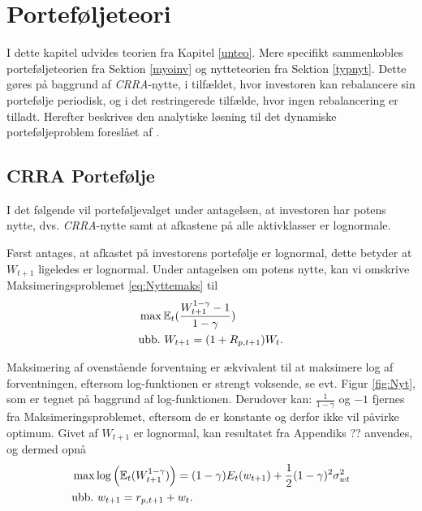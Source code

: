 \documentclass[
  a4paper,
  oneside]{memoir}
\begin{document}
\hypertarget{portefuxf8ljeteori}{%
\chapter{Porteføljeteori}\label{portefuxf8ljeteori}}

I dette kapitel udvides teorien fra Kapitel \ref{unteo}. Mere specifikt sammenkobles porteføljeteorien fra Sektion \ref{myoinv} og nytteteorien fra Sektion \ref{typnyt}. Dette gøres på baggrund af \emph{CRRA}-nytte, i tilfældet, hvor investoren kan rebalancere sin portefølje periodisk, og i det restringerede tilfælde, hvor ingen rebalancering er tilladt. Herefter beskrives den analytiske løsning til det dynamiske porteføljeproblem foreslået af \citep{JurVic2011}.

\hypertarget{crraportef}{%
\section{CRRA Portefølje}\label{crraportef}}

I det følgende vil porteføljevalget under antagelsen, at investoren har potens nytte, dvs. \emph{CRRA}-nytte samt at afkastene på alle aktivklasser er lognormale.

Først antages, at afkastet på investorens portefølje er lognormal, dette betyder at \(W_{t+1}\) ligeledes er lognormal. Under antagelsen om potens nytte, kan vi omskrive Maksimeringsproblemet \eqref{eq:Nyttemaks} til
\begin{align}
&\max\mathbb{E}_t(\frac{W_{t+1}^{1-\gamma}-1}{1-\gamma}) \label{eq:CRRAmaks}\\
&\text{ubb.}\,\,W_{t+1}=(1+R_{p,t+1})W_t.\notag
\end{align}

Maksimering af ovenstående forventning er ækvivalent til at maksimere log af forventningen, eftersom log-funktionen er strengt voksende, se evt. Figur \ref{fig:Nyt}, som er tegnet på baggrund af log-funktionen. Derudover kan: \(\tfrac{1}{1-\gamma}\) og \(-1\) fjernes fra Maksimeringsproblemet, eftersom de er konstante og derfor ikke vil påvirke optimum. Givet af \(W_{t+1}\) er lognormal, kan resultatet fra Appendiks ?? anvendes, og dermed opnå
\begin{align}
&\max \log\left(\mathbb{E}_t(W_{t+1}^{1-\gamma})\right)=(1-\gamma){E}_t(w_{t+1})+\frac{1}{2}(1-\gamma)^2\sigma_{wt}^2 \label{eq:CRRAmakslog}\\
&\text{ubb.}\,\,w_{t+1}=r_{p,t+1} + w_t.\notag
\end{align}
\end{document}
